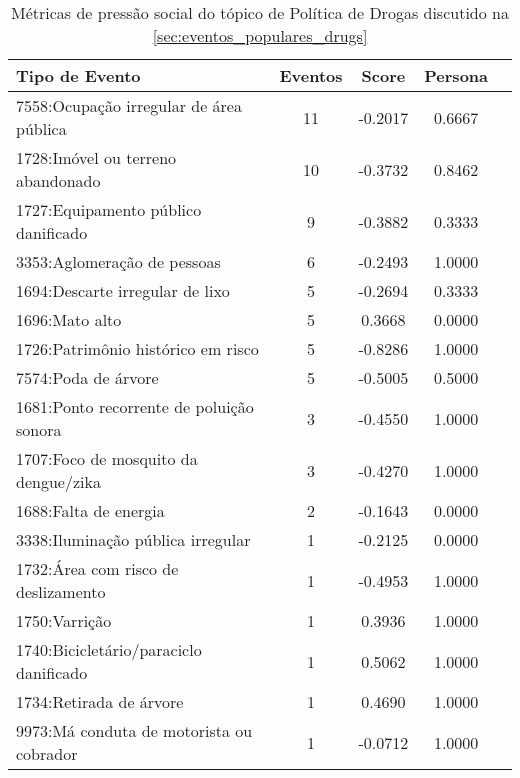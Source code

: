 \begin{table}[htbp]
	\centering
	\caption{Métricas de pressão social do tópico de Política de Drogas discutido na \autoref{sec:eventos_populares_drugs}}
	\label{tab:eventos_populares_drugs}
	\begin{tabular}{|l|c|c|c|c|}
		\hline
		\textbf{Tipo de Evento}                  & \textbf{Eventos} & \textbf{Score} & \textbf{Persona} \\
		\hline
		7558:Ocupação irregular de área pública  & 11               & -0.2017        & 0.6667           \\
		\hline
		1728:Imóvel ou terreno abandonado        & 10               & -0.3732        & 0.8462           \\
		\hline
		1727:Equipamento público danificado      & 9                & -0.3882        & 0.3333           \\
		\hline
		3353:Aglomeração de pessoas              & 6                & -0.2493        & 1.0000           \\
		\hline
		1694:Descarte irregular de lixo          & 5                & -0.2694        & 0.3333           \\
		\hline
		1696:Mato alto                           & 5                & 0.3668         & 0.0000           \\
		\hline
		1726:Patrimônio histórico em risco       & 5                & -0.8286        & 1.0000           \\
		\hline
		7574:Poda de árvore                      & 5                & -0.5005        & 0.5000           \\
		\hline
		1681:Ponto recorrente de poluição sonora & 3                & -0.4550        & 1.0000           \\
		\hline
		1707:Foco de mosquito da dengue/zika     & 3                & -0.4270        & 1.0000           \\
		\hline
		1688:Falta de energia                    & 2                & -0.1643        & 0.0000           \\
		\hline
		3338:Iluminação pública irregular        & 1                & -0.2125        & 0.0000           \\
		\hline
		1732:Área com risco de deslizamento      & 1                & -0.4953        & 1.0000           \\
		\hline
		1750:Varrição                            & 1                & 0.3936         & 1.0000           \\
		\hline
		1740:Bicicletário/paraciclo danificado   & 1                & 0.5062         & 1.0000           \\
		\hline
		1734:Retirada de árvore                  & 1                & 0.4690         & 1.0000           \\
		\hline
		9973:Má conduta de motorista ou cobrador & 1                & -0.0712        & 1.0000           \\
		\hline
	\end{tabular}
\end{table}

